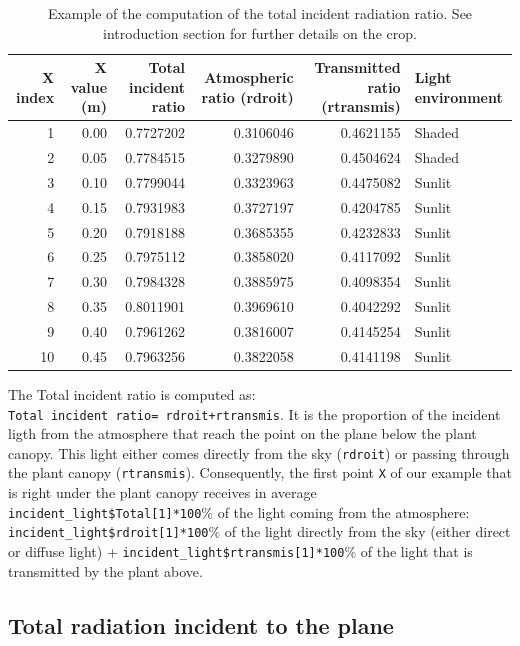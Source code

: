 \documentclass[]{book}
\theoremstyle{definition}
\theoremstyle{definition}
\theoremstyle{definition}
\theoremstyle{remark}
\begin{document}
\begin{table}

\caption{\label{tab:unnamed-chunk-5}Example of the computation of the total incident radiation ratio. See introduction section for further details on the crop.}
\centering
\begin{tabular}[t]{r|r|r|r|r|l}
\hline
X index & X value (m) & Total incident ratio & Atmospheric ratio (rdroit) & Transmitted ratio (rtransmis) & Light environment\\
\hline
1 & 0.00 & 0.7727202 & 0.3106046 & 0.4621155 & Shaded\\
\hline
2 & 0.05 & 0.7784515 & 0.3279890 & 0.4504624 & Shaded\\
\hline
3 & 0.10 & 0.7799044 & 0.3323963 & 0.4475082 & Sunlit\\
\hline
4 & 0.15 & 0.7931983 & 0.3727197 & 0.4204785 & Sunlit\\
\hline
5 & 0.20 & 0.7918188 & 0.3685355 & 0.4232833 & Sunlit\\
\hline
6 & 0.25 & 0.7975112 & 0.3858020 & 0.4117092 & Sunlit\\
\hline
7 & 0.30 & 0.7984328 & 0.3885975 & 0.4098354 & Sunlit\\
\hline
8 & 0.35 & 0.8011901 & 0.3969610 & 0.4042292 & Sunlit\\
\hline
9 & 0.40 & 0.7961262 & 0.3816007 & 0.4145254 & Sunlit\\
\hline
10 & 0.45 & 0.7963256 & 0.3822058 & 0.4141198 & Sunlit\\
\hline
\end{tabular}
\end{table}

The Total incident ratio is computed as:
\texttt{Total\ incident\ ratio=\ rdroit+rtransmis}. It is the proportion
of the incident ligth from the atmosphere that reach the point on the
plane below the plant canopy. This light either comes directly from the
sky (\texttt{rdroit}) or passing through the plant canopy
(\texttt{rtransmis}). Consequently, the first point \texttt{X} of our
example that is right under the plant canopy receives in average
\texttt{incident\_light\$Total{[}1{]}*100}\% of the light coming from
the atmosphere: \texttt{incident\_light\$rdroit{[}1{]}*100}\% of the
light directly from the sky (either direct or diffuse light) +
\texttt{incident\_light\$rtransmis{[}1{]}*100}\% of the light that is
transmitted by the plant above.

\subsection{Total radiation incident to the
plane}\label{total-radiation-incident-to-the-plane}
\end{document}
